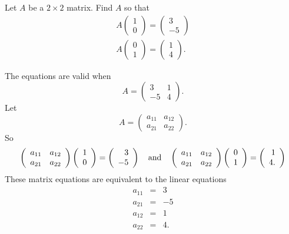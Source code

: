 \documentclass{article}
\begin{document}
\begin{exercise} \label{c4.1.7}
Let $A$ be a $2\times 2$ matrix.  Find $A$ so that
\begin{eqnarray*}
A\left(\begin{array}{c} 1 \\ 0 \end{array}\right) =
\left(\begin{array}{r} 3 \\ -5 \end{array}\right) \\
A\left(\begin{array}{c} 0 \\ 1 \end{array}\right) =
\left(\begin{array}{r} 1 \\ 4 \end{array}\right).
\end{eqnarray*}

\begin{solution}

\ans The equations are valid when
\[ A = \left(\begin{array}{rr} 3 & 1 \\ -5 & 4\end{array}\right). \]
\soln Let
\[ A = \left(\begin{array}{rr} a_{11} & a_{12} \\ a_{21} & 
a_{22}\end{array}\right). \]
So
\[ \left(\begin{array}{rr} a_{11} & a_{12} \\ a_{21} & a_{22}\end{array}\right)
\left(\begin{array}{r} 1 \\ 0\end{array}\right) =
\left(\begin{array}{r} 3 \\ -5\end{array}\right) \quad\mbox{and}\quad
\left(\begin{array}{rr} a_{11} & a_{12} \\ a_{21} & a_{22}\end{array}\right)
\left(\begin{array}{r} 0 \\ 1\end{array}\right) =
\left(\begin{array}{r} 1 \\ 4.\end{array}\right) \]
These matrix equations are equivalent to the linear equations
\[ \begin{array}{rcl}
a_{11} & = & 3 \\
a_{21} & = & -5 \\
a_{12} & = & 1 \\
a_{22} & = & 4.\end{array} \]


\end{solution}
\end{exercise}
\end{document}
